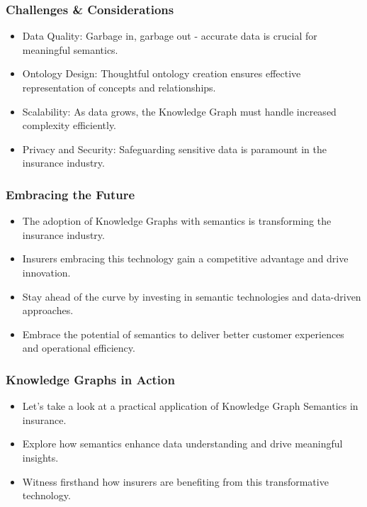 \begin{frame}[fragile]\frametitle{Challenges \& Considerations}
  \begin{itemize}
    \item Data Quality: Garbage in, garbage out - accurate data is crucial for meaningful semantics.
    \item Ontology Design: Thoughtful ontology creation ensures effective representation of concepts and relationships.
    \item Scalability: As data grows, the Knowledge Graph must handle increased complexity efficiently.
    \item Privacy and Security: Safeguarding sensitive data is paramount in the insurance industry.
  \end{itemize}
\end{frame}

\begin{frame}[fragile]\frametitle{Embracing the Future}
  \begin{itemize}
    \item The adoption of Knowledge Graphs with semantics is transforming the insurance industry.
    \item Insurers embracing this technology gain a competitive advantage and drive innovation.
    \item Stay ahead of the curve by investing in semantic technologies and data-driven approaches.
    \item Embrace the potential of semantics to deliver better customer experiences and operational efficiency.
  \end{itemize}
\end{frame}

\begin{frame}[fragile]\frametitle{Knowledge Graphs in Action}
  \begin{itemize}
    \item Let's take a look at a practical application of Knowledge Graph Semantics in insurance.
    \item Explore how semantics enhance data understanding and drive meaningful insights.
    \item Witness firsthand how insurers are benefiting from this transformative technology.
  \end{itemize}
\end{frame}

